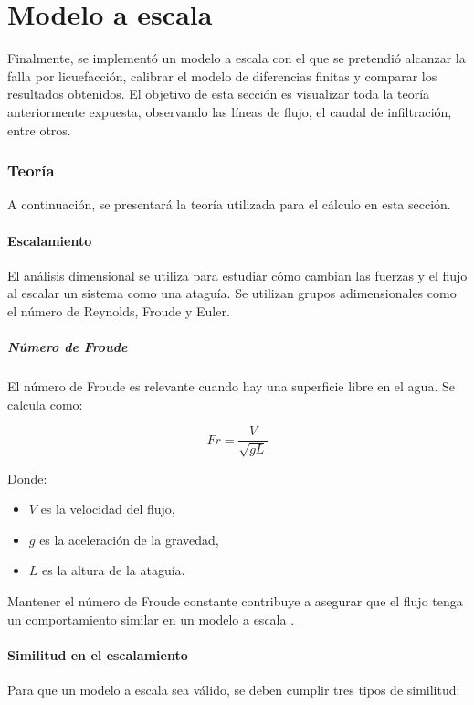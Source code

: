 \part{Modelo a escala}

Finalmente, se implementó un modelo a escala con el que se pretendió alcanzar la falla por licuefacción, calibrar el modelo de diferencias finitas y comparar los resultados obtenidos. El objetivo de esta sección es visualizar toda la teoría anteriormente expuesta, observando las líneas de flujo, el caudal de infiltración, entre otros.

\section{Teoría}

A continuación, se presentará la teoría utilizada para el cálculo en esta sección.

\subsection{Escalamiento}
El análisis dimensional se utiliza para estudiar cómo cambian las fuerzas y el flujo al escalar un sistema como una ataguía. Se utilizan grupos adimensionales como el número de Reynolds, Froude y Euler.

\subsubsection{Número de Froude}
El número de Froude es relevante cuando hay una superficie libre en el agua. Se calcula como:

\begin{equation}
Fr = \frac{V}{\sqrt{g L}}
\end{equation}

Donde:
\begin{itemize}
    \item $V$ es la velocidad del flujo,
    \item $g$ es la aceleración de la gravedad,
    \item $L$ es la altura de la ataguía.
\end{itemize}

Mantener el número de Froude constante contribuye a asegurar que el flujo tenga un comportamiento similar en un modelo a escala \citep{munson2011}.
\subsection{Similitud en el escalamiento}
Para que un modelo a escala sea válido, se deben cumplir tres tipos de similitud:


